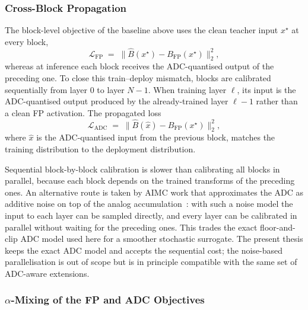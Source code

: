 \documentclass[a4paper,11pt,oneside]{article}
\theoremstyle{breakstyle}
\begin{document}
  \subsubsection{Cross-Block Propagation}

  The block-level objective of the baseline above uses the clean
  teacher input $x^\star$ at every block,
  \begin{equation}
      \mathcal{L}_{\mathrm{FP}}
      \;=\;
      \bigl\| \hat{B}(x^\star) - B_{\mathrm{FP}}(x^\star) \bigr\|_2^2,
      \label{eq:loss_fp}
  \end{equation}
  whereas at inference each block receives the ADC-quantised output
  of the preceding one. To close this train--deploy mismatch, blocks
  are calibrated sequentially from layer $0$ to layer $N{-}1$. When
  training layer $\ell$, its input is the ADC-quantised output
  produced by the already-trained layer $\ell{-}1$ rather than a
  clean FP activation. The propagated loss
  \begin{equation}
      \mathcal{L}_{\mathrm{ADC}}
      \;=\;
      \bigl\| \hat{B}(\hat{x}) - B_{\mathrm{FP}}(x^\star) \bigr\|_2^2,
      \label{eq:loss_adc}
  \end{equation}
  where $\hat{x}$ is the ADC-quantised input from the previous block,
  matches the training distribution to the deployment distribution.

  Sequential block-by-block calibration is slower than calibrating
  all blocks in parallel, because each block depends on the trained
  transforms of the preceding ones. An alternative route is taken by
  AIMC work that approximates the ADC as additive noise on top of the
  analog accumulation~\cite{Xiao2021AnalogAccuracy,LeGallo2023AnalogNAS,Buechel2025AnalogFoundation}:
  with such a noise model the input to each layer can be sampled
  directly, and every layer can be calibrated in parallel without
  waiting for the preceding ones. This trades the exact floor-and-clip
  ADC model used here for a smoother stochastic surrogate. The present
  thesis keeps the exact ADC model and accepts the sequential cost;
  the noise-based parallelisation is out of scope but is in principle
  compatible with the same set of ADC-aware extensions.

  \subsubsection{$\alpha$-Mixing of the FP and ADC Objectives}
\end{document}
